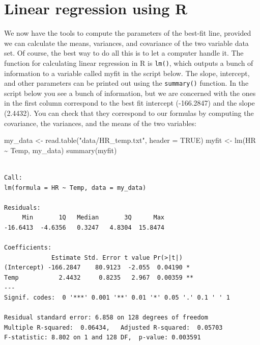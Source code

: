 \documentclass[
  letterpaper,
  DIV=11,
  numbers=noendperiod]{scrreprt}
\newenvironment{Shaded}{\begin{snugshade}}{\end{snugshade}}
\newcommand{\AttributeTok}[1]{\textcolor[rgb]{0.40,0.45,0.13}{#1}}
\newcommand{\ConstantTok}[1]{\textcolor[rgb]{0.56,0.35,0.01}{#1}}
\newcommand{\FunctionTok}[1]{\textcolor[rgb]{0.28,0.35,0.67}{#1}}
\newcommand{\NormalTok}[1]{\textcolor[rgb]{0.00,0.23,0.31}{#1}}
\newcommand{\OtherTok}[1]{\textcolor[rgb]{0.00,0.23,0.31}{#1}}
\newcommand{\SpecialCharTok}[1]{\textcolor[rgb]{0.37,0.37,0.37}{#1}}
\newcommand{\StringTok}[1]{\textcolor[rgb]{0.13,0.47,0.30}{#1}}
\begin{document}
\hypertarget{linear-regression-using-r}{%
\section{Linear regression using R}\label{linear-regression-using-r}}

\label{sec:comp6}

We now have the tools to compute the parameters of the best-fit line,
provided we can calculate the means, variances, and covariance of the
two variable data set. Of course, the best way to do all this is to let
a computer handle it. The function for calculating linear regression in
R is \texttt{lm()}, which outputs a bunch of information to a variable
called myfit in the script below. The slope, intercept, and other
parameters can be printed out using
the \texttt{summary()} function. In the script below you see a bunch of
information, but we are concerned with the ones in the first column
correspond to the best fit intercept (-166.2847) and the slope (2.4432).
You can check that they correspond to our formulas by computing the
covariance, the variances, and the means of the two variables:

\begin{Shaded}
\begin{Highlighting}[]
\NormalTok{my\_data }\OtherTok{\textless{}{-}} \FunctionTok{read.table}\NormalTok{(}\StringTok{"data/HR\_temp.txt"}\NormalTok{, }\AttributeTok{header =} \ConstantTok{TRUE}\NormalTok{)}
\NormalTok{myfit }\OtherTok{\textless{}{-}} \FunctionTok{lm}\NormalTok{(HR }\SpecialCharTok{\textasciitilde{}}\NormalTok{ Temp, my\_data)}
\FunctionTok{summary}\NormalTok{(myfit)}
\end{Highlighting}
\end{Shaded}

\begin{verbatim}

Call:
lm(formula = HR ~ Temp, data = my_data)

Residuals:
     Min       1Q   Median       3Q      Max 
-16.6413  -4.6356   0.3247   4.8304  15.8474 

Coefficients:
             Estimate Std. Error t value Pr(>|t|)   
(Intercept) -166.2847    80.9123  -2.055  0.04190 * 
Temp           2.4432     0.8235   2.967  0.00359 **
---
Signif. codes:  0 '***' 0.001 '**' 0.01 '*' 0.05 '.' 0.1 ' ' 1

Residual standard error: 6.858 on 128 degrees of freedom
Multiple R-squared:  0.06434,   Adjusted R-squared:  0.05703 
F-statistic: 8.802 on 1 and 128 DF,  p-value: 0.003591
\end{verbatim}
\end{document}
